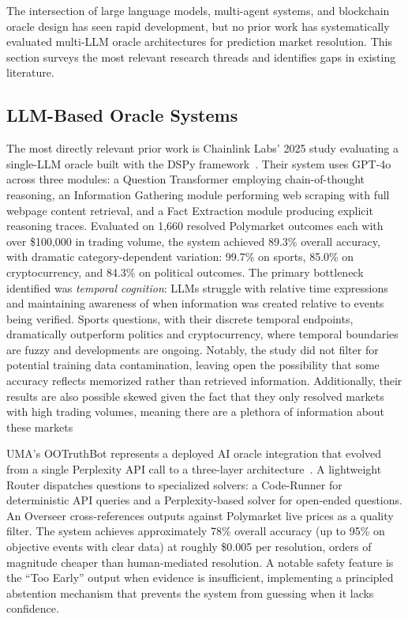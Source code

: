

The intersection of large language models, multi-agent systems, and blockchain oracle design has seen rapid development, but no prior work has systematically evaluated multi-LLM oracle architectures for prediction market resolution. This section surveys the most relevant research threads and identifies gaps in existing literature.

\subsection{LLM-Based Oracle Systems}

The most directly relevant prior work is Chainlink Labs' 2025 study evaluating a single-LLM oracle built with the DSPy framework~\cite{chainlink2025aioracles}. Their system uses GPT-4o across three modules: a Question Transformer employing chain-of-thought reasoning, an Information Gathering module performing web scraping with full webpage content retrieval, and a Fact Extraction module producing explicit reasoning traces. Evaluated on 1,660 resolved Polymarket outcomes each with over \$100,000 in trading volume, the system achieved 89.3\% overall accuracy, with dramatic category-dependent variation: 99.7\% on sports, 85.0\% on cryptocurrency, and 84.3\% on political outcomes. The primary bottleneck identified was \emph{temporal cognition}: LLMs struggle with relative time expressions and maintaining awareness of when information was created relative to events being verified. Sports questions, with their discrete temporal endpoints, dramatically outperform politics and cryptocurrency, where temporal boundaries are fuzzy and developments are ongoing. Notably, the study did not filter for potential training data contamination, leaving open the possibility that some accuracy reflects memorized rather than retrieved information. Additionally, their results are also possible skewed given the fact that they only resolved markets with high trading volumes, meaning there are a plethora of information about these markets

UMA's OOTruthBot represents a deployed AI oracle integration that evolved from a single Perplexity API call to a three-layer architecture~\cite{uma2025truthbot}. A lightweight Router dispatches questions to specialized solvers: a Code-Runner for deterministic API queries and a Perplexity-based solver for open-ended questions. An Overseer cross-references outputs against Polymarket live prices as a quality filter. The system achieves approximately 78\% overall accuracy (up to 95\% on objective events with clear data) at roughly \$0.005 per resolution, orders of magnitude cheaper than human-mediated resolution. A notable safety feature is the ``Too Early'' output when evidence is insufficient, implementing a principled abstention mechanism that prevents the system from guessing when it lacks confidence.

